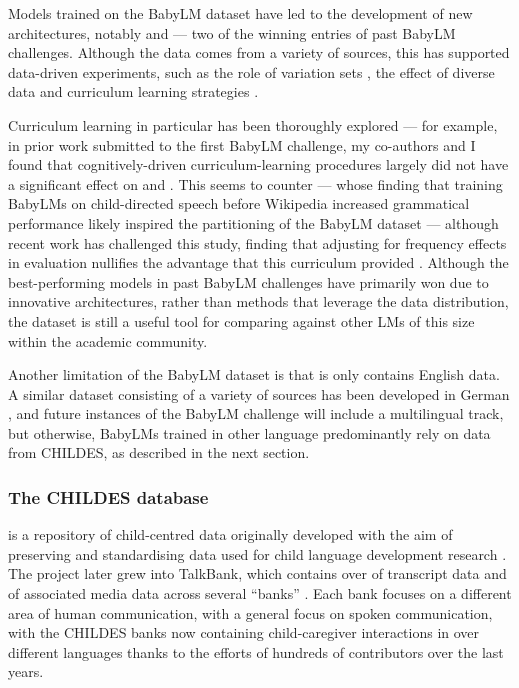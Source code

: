 Models trained on the BabyLM dataset have led to the development of new architectures, notably  \citep{georges-gabriel-charpentier-samuel-2023-layers} and  \citet{charpentier2024gpt} --- two of the winning entries of past BabyLM challenges. Although the data comes from a variety of sources, this has supported data-driven experiments, such as the role of variation sets \citep{haga-etal-2024-babylm}, the effect of diverse data \citep{yam-paek-2024-baby} and curriculum learning strategies \citep{debenedetto-2023-byte, nguyen-etal-2024-automatic, capone-etal-2024-concretegpt}.

Curriculum learning in particular has been thoroughly explored --- for example, in prior work submitted to the  first BabyLM challenge, my co-authors and I found that cognitively-driven curriculum-learning procedures largely did not have a significant effect on \blimp and \glue \citep{martinez-etal-2023-climb}. This seems to counter \citet{huebner-etal-2021-babyberta} --- whose finding that training BabyLMs on child-directed speech before Wikipedia increased grammatical performance likely inspired the partitioning of the BabyLM dataset --- although recent work has challenged this study, finding that adjusting for frequency effects in evaluation nullifies the advantage that this curriculum provided \citep{padovani2025child}. Although the best-performing models in past BabyLM challenges have primarily won due to innovative architectures, rather than methods that leverage the data distribution, the dataset is still a useful tool for comparing against other LMs of this size within the academic community.


Another limitation of the BabyLM dataset is that is only contains English data. A similar dataset consisting of a variety of sources has been developed in German \citep{bunzeck2025constructiondistributionsshapeformal}, and future instances of the BabyLM challenge will include a multilingual track, but otherwise, BabyLMs trained in other language predominantly rely on data from CHILDES, as described in the next section. 

\subsubsection{The CHILDES database}\label{sec:12-childes}

\childes is a repository of child-centred data originally developed with the aim of preserving and standardising data used for child language development research \citep{macwhinney1985child}. The project later grew into TalkBank, which contains over  of transcript data and  of associated media data across several ``banks'' \citep{macwhinney_understanding_2019}. Each bank focuses on a different area of human communication, with a general focus on spoken communication, with the CHILDES banks now containing child-caregiver interactions in over  different languages thanks to the efforts of hundreds of contributors over the last  years. 

